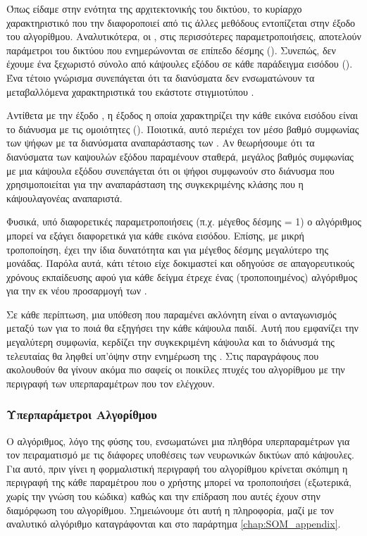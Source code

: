 Όπως είδαμε στην ενότητα της αρχιτεκτονικής του δικτύου, το κυρίαρχο χαρακτηριστικό που την διαφοροποιεί από τις άλλες μεθόδους εντοπίζεται στην έξοδο του αλγορίθμου. Αναλυτικότερα, οι , στις περισσότερες παραμετροποιήσεις, αποτελούν παράμετροι του δικτύου που ενημερώνονται σε επίπεδο δέσμης (). Συνεπώς, δεν έχουμε ένα ξεχωριστό σύνολο από κάψουλες εξόδου σε κάθε παράδειγμα εισόδου (). Ένα τέτοιο γνώρισμα συνεπάγεται ότι τα διανύσματα  δεν ενσωματώνουν τα μεταβαλλόμενα χαρακτηριστικά του εκάστοτε στιγμιοτύπου .\par

Αντίθετα με την έξοδο , η έξοδος η οποία χαρακτηρίζει την κάθε εικόνα εισόδου είναι το διάνυσμα με τις ομοιότητες (). Ποιοτικά, αυτό περιέχει τον μέσο βαθμό συμφωνίας των ψήφων με τα διανύσματα αναπαράστασης των . Αν θεωρήσουμε ότι τα διανύσματα των καψουλών εξόδου παραμένουν σταθερά, μεγάλος βαθμός συμφωνίας με μια κάψουλα εξόδου συνεπάγεται ότι οι ψήφοι συμφωνούν στο διάνυσμα που χρησιμοποιείται για την αναπαράσταση της συγκεκριμένης κλάσης που η κάψουλα\textendash γονέας αναπαριστά.\par

Φυσικά, υπό διαφορετικές παραμετροποιήσεις (π.χ. μέγεθος δέσμης = 1) ο αλγόριθμος μπορεί να εξάγει διαφορετικά  για κάθε εικόνα εισόδου. Επίσης, με μικρή τροποποίηση, έχει την ίδια δυνατότητα και για μέγεθος δέσμης μεγαλύτερο της μονάδας. Παρόλα αυτά, κάτι τέτοιο είχε δοκιμαστεί και οδηγούσε σε απαγορευτικούς χρόνους εκπαίδευσης αφού για κάθε δείγμα έτρεχε ένας (τροποποιημένος) αλγόριθμος  για την εκ νέου προσαρμογή των .\par 

Σε κάθε περίπτωση, μια υπόθεση που παραμένει ακλόνητη είναι ο ανταγωνισμός μεταξύ των  για το ποιά θα εξηγήσει την κάθε κάψουλα παιδί. Αυτή που εμφανίζει την μεγαλύτερη συμφωνία, κερδίζει την συγκεκριμένη κάψουλα και το διάνυσμά της τελευταίας θα ληφθεί υπ'όψην στην ενημέρωση της . Στις παραγράφους που ακολουθούν θα γίνουν ακόμα πιο σαφείς οι ποικίλες πτυχές του αλγορίθμου με την περιγραφή των υπερπαραμέτρων που τον ελέγχουν.

\subsubsection{Υπερπαράμετροι Αλγορίθμου}

Ο αλγόριθμος, λόγο της φύσης του, ενσωματώνει μια πληθόρα υπερπαραμέτρων για τον πειραματισμό με τις διάφορες υποθέσεις των νευρωνικών δικτύων από κάψουλες. Για αυτό, πριν γίνει η φορμαλιστική περιγραφή του αλγορίθμου κρίνεται σκόπιμη η περιγραφή της κάθε παραμέτρου που ο χρήστης μπορεί να τροποποιήσει (εξωτερικά, χωρίς την γνώση του κώδικα) καθώς και την επίδραση που αυτές έχουν στην διαμόρφωση του αλγορίθμου. Σημειώνουμε ότι αυτή η πληροφορία, μαζί με τον αναλυτικό αλγόριθμο καταγράφονται και στο παράρτημα \ref{chap:SOM_appendix}.\par

